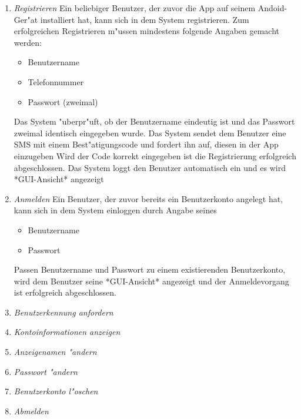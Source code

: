 \documentclass[parskip=full]{scrartcl}
\def\threedigits#1{%
  \ifnum#1<100 0\fi
  \ifnum#1<10 0\fi
  \number#1}
\begin{document}
\begin{enumerate}[label={\textbf{/F\protect\threedigits{\theenumi}0/}}, leftmargin=*]
	\item \textit{Registrieren} Ein beliebiger Benutzer, der zuvor die App auf seinem Andoid-Ger"at installiert hat, kann sich in dem System registrieren. Zum erfolgreichen Registrieren m"ussen mindestens folgende Angaben gemacht werden:
	\begin{itemize}
		\item Benutzername
		\item Telefonnummer %
		\item Passwort (zweimal) %
	\end{itemize}
	 Das System "uberpr"uft, ob der Benutzername eindeutig ist und das Passwort zweimal identisch eingegeben wurde. Das System sendet dem Benutzer eine SMS %
	 mit einem Best"atigungscode und fordert ihn auf, diesen in der App einzugeben %
	 Wird der Code korrekt eingegeben ist die Registrierung erfolgreich abgeschlossen. Das System loggt den Benutzer automatisch ein und es wird *GUI-Ansicht* angezeigt %
	\item \textit{Anmelden} Ein Benutzer, der zuvor bereits ein Benutzerkonto angelegt hat, kann sich in dem System einloggen durch Angabe seines
	\begin{itemize}
		\item Benutzername
		\item Passwort
	\end{itemize}
	Passen Benutzername und Passwort zu einem existierenden Benutzerkonto, wird dem Benutzer seine *GUI-Ansicht* angezeigt und der Anmeldevorgang ist erfolgreich abgeschlossen.
	
	\item \textit{Benutzerkennung anfordern}
	\item \textit{Kontoinformationen anzeigen}
	\item \textit{Anzeigenamen "andern}
	\item \textit{Passwort "andern}
	\item \textit{Benutzerkonto l"oschen}
	\item \textit{Abmelden}
\end{enumerate}
\end{document}
